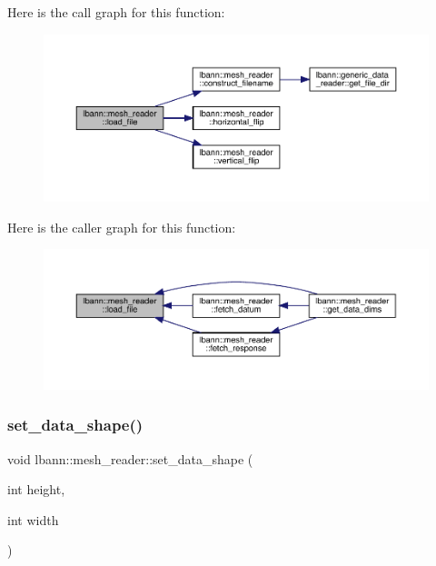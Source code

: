 Here is the call graph for this function\+:\nopagebreak
\begin{figure}[H]
\begin{center}
\leavevmode
\includegraphics[width=350pt]{classlbann_1_1mesh__reader_a8cbffa6676c89c44174a7085ea3baeca_cgraph}
\end{center}
\end{figure}
Here is the caller graph for this function\+:\nopagebreak
\begin{figure}[H]
\begin{center}
\leavevmode
\includegraphics[width=350pt]{classlbann_1_1mesh__reader_a8cbffa6676c89c44174a7085ea3baeca_icgraph}
\end{center}
\end{figure}
\mbox{\label{classlbann_1_1mesh__reader_a812e878aa1aafdfe833b70251860b3a2}} 
\subsubsection{\texorpdfstring{set\+\_\+data\+\_\+shape()}{set\_data\_shape()}}
{\footnotesize\ttfamily void lbann\+::mesh\+\_\+reader\+::set\+\_\+data\+\_\+shape (\begin{DoxyParamCaption}\item[{int}]{height,  }\item[{int}]{width }\end{DoxyParamCaption})\hspace{0.3cm}{\ttfamily [inline]}}



